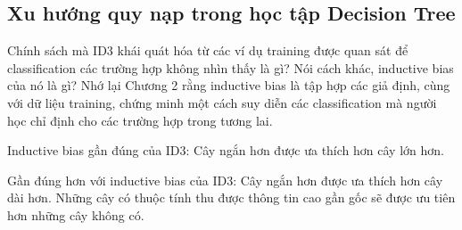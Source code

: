 \subsection{Xu hướng quy nạp trong học tập Decision Tree}

Chính sách mà ID3 khái quát hóa từ các ví dụ training được quan sát để classification các trường hợp không nhìn thấy là gì? Nói cách khác, inductive bias của nó là gì? Nhớ lại Chương 2 rằng inductive bias là tập hợp các giả định, cùng với dữ liệu training, chứng minh một cách suy diễn các classification mà người học chỉ định cho các trường hợp trong tương lai.

Inductive bias gần đúng của ID3: Cây ngắn hơn được ưa thích hơn cây lớn hơn.

Gần đúng hơn với inductive bias của ID3: Cây ngắn hơn được ưa thích hơn cây dài hơn. Những cây có thuộc tính thu được thông tin cao gần gốc sẽ được ưu tiên hơn những cây không có.

